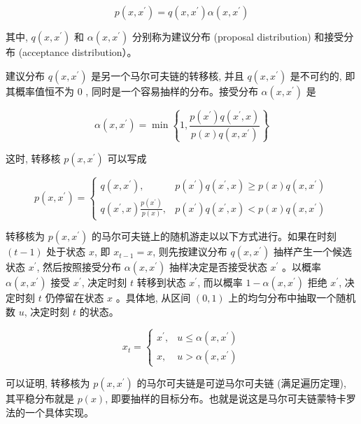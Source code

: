\documentclass[10pt]{article}
\begin{document}
\begin{CJK*}{UTF8}{bsmi}
\begin{equation*}
p\left(x, x^{\prime}\right)=q\left(x, x^{\prime}\right) \alpha\left(x, x^{\prime}\right) \tag{19.38}
\end{equation*}


其中, $q\left(x, x^{\prime}\right)$ 和 $\alpha\left(x, x^{\prime}\right)$ 分别称为建议分布 (proposal distribution) 和接受分布 (acceptance distribution）。

建议分布 $q\left(x, x^{\prime}\right)$ 是另一个马尔可夫链的转移核, 并且 $q\left(x, x^{\prime}\right)$ 是不可约的, 即其概率值恒不为 0 , 同时是一个容易抽样的分布。接受分布 $\alpha\left(x, x^{\prime}\right)$ 是


\begin{equation*}
\alpha\left(x, x^{\prime}\right)=\min \left\{1, \frac{p\left(x^{\prime}\right) q\left(x^{\prime}, x\right)}{p(x) q\left(x, x^{\prime}\right)}\right\} \tag{19.39}
\end{equation*}


这时, 转移核 $p\left(x, x^{\prime}\right)$ 可以写成

\[
p\left(x, x^{\prime}\right)= \begin{cases}q\left(x, x^{\prime}\right), & p\left(x^{\prime}\right) q\left(x^{\prime}, x\right) \geqslant p(x) q\left(x, x^{\prime}\right)  \tag{19.40}\\ q\left(x^{\prime}, x\right) \frac{p\left(x^{\prime}\right)}{p(x)}, & p\left(x^{\prime}\right) q\left(x^{\prime}, x\right)<p(x) q\left(x, x^{\prime}\right)\end{cases}
\]

转移核为 $p\left(x, x^{\prime}\right)$ 的马尔可夫链上的随机游走以以下方式进行。如果在时刻 $(t-1)$ 处于状态 $x$, 即 $x_{t-1}=x$, 则先按建议分布 $q\left(x, x^{\prime}\right)$ 抽样产生一个候选状态 $x^{\prime}$, 然后按照接受分布 $\alpha\left(x, x^{\prime}\right)$ 抽样决定是否接受状态 $x^{\prime}$ 。以概率 $\alpha\left(x, x^{\prime}\right)$ 接受 $x^{\prime}$, 决定时刻 $t$ 转移到状态 $x^{\prime}$, 而以概率 $1-\alpha\left(x, x^{\prime}\right)$ 拒绝 $x^{\prime}$, 决定时刻 $t$ 仍停留在状态 $x$ 。具体地, 从区间 $(0,1)$ 上的均匀分布中抽取一个随机数 $u$, 决定时刻 $t$ 的状态。

$$
x_{t}= \begin{cases}x^{\prime}, & u \leqslant \alpha\left(x, x^{\prime}\right) \\ x, & u>\alpha\left(x, x^{\prime}\right)\end{cases}
$$

可以证明, 转移核为 $p\left(x, x^{\prime}\right)$ 的马尔可夫链是可逆马尔可夫链 (满足遍历定理), 其平稳分布就是 $p(x)$, 即要抽样的目标分布。也就是说这是马尔可夫链蒙特卡罗法的一个具体实现。


\end{CJK*}
\end{document}
